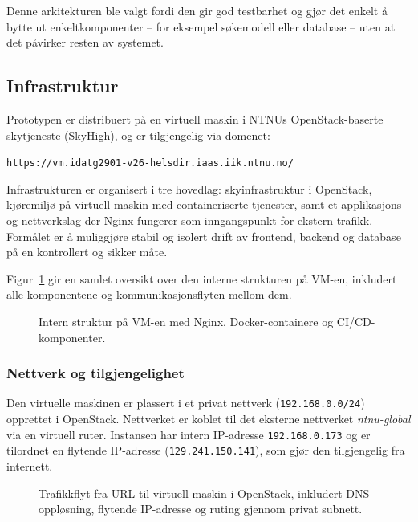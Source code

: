 Denne arkitekturen ble valgt fordi den gir god testbarhet og gjør det enkelt å bytte ut
enkeltkomponenter -- for eksempel søkemodell eller database -- uten at det påvirker
resten av systemet.



\subsection{Infrastruktur}

Prototypen er distribuert på en virtuell maskin i NTNUs OpenStack-baserte
skytjeneste (SkyHigh), og er tilgjengelig via domenet:

\texttt{https://vm.idatg2901-v26-helsdir.iaas.iik.ntnu.no/}

Infrastrukturen er organisert i tre hovedlag: skyinfrastruktur i OpenStack,
kjøremiljø på virtuell maskin med containeriserte tjenester, samt et
applikasjons- og nettverkslag der Nginx fungerer som inngangspunkt for
ekstern trafikk. Formålet er å muliggjøre stabil og isolert drift av
frontend, backend og database på en kontrollert og sikker måte.

Figur~\ref{fig:vm-internal} gir en samlet oversikt over den interne
strukturen på VM-en, inkludert alle komponentene og kommunikasjonsflyten
mellom dem.

\begin{figure}[H]
    \centering
    
    \caption{Intern struktur på VM-en med Nginx, Docker-containere og CI/CD-komponenter.}
    \label{fig:vm-internal}
\end{figure}

\subsubsection{Nettverk og tilgjengelighet}

Den virtuelle maskinen er plassert i et privat nettverk
(\texttt{192.168.0.0/24}) opprettet i OpenStack. Nettverket er koblet
til det eksterne nettverket \textit{ntnu-global} via en virtuell ruter.
Instansen har intern IP-adresse \texttt{192.168.0.173} og er tilordnet
en flytende IP-adresse (\texttt{129.241.150.141}), som gjør den
tilgjengelig fra internett.

\begin{figure}[H]
    \centering
    
    \caption{Trafikkflyt fra URL til virtuell maskin i OpenStack, inkludert
    DNS-oppløsning, flytende IP-adresse og ruting gjennom privat subnett.}
    \label{fig:infra-setup}
\end{figure}

